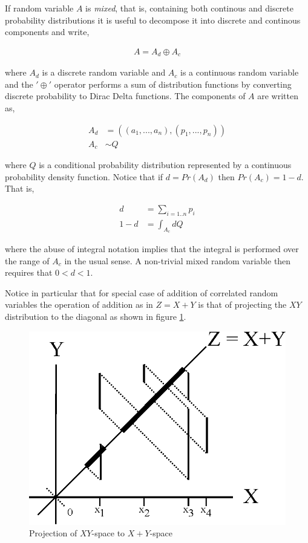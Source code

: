 If random variable $A$ is \emph{mixed}, that is, containing both continous and discrete probability distributions it is useful to decompose it into discrete and continous components and write,

\begin{align*}
A = A_d \oplus A_c
\end{align*}

where $A_d$ is a discrete random variable and $A_c$ is a continuous random variable and the $'\oplus'$ operator performs a sum of distribution functions by converting discrete probability to Dirac Delta functions. The components of $A$ are written as,

\begin{align*}
A_d &= ((a_1, ..., a_n),(p_1, ..., p_n))\\
A_c &\sim Q
\end{align*}

where $Q$ is a conditional probability distribution represented by a continuous probability density function. Notice that if $d = Pr(A_d)$ then $Pr(A_c) = 1-d$. That is,

\begin{align*}
d &= \sum_{i = 1..n}p_i\\
1-d &= \int_{A_c} dQ
\end{align*}

where the abuse of integral notation implies that the integral is performed over the range of $A_c$ in the usual sense. A non-trivial mixed random variable then requires that $0 < d < 1$. 

Notice in particular that for special case of addition of correlated random variables the operation of addition as in $Z = X+Y$ is that of projecting the $XY$ distribution to the diagonal as shown in figure \ref{fig:XY_addition_projection}. 

\begin{figure}
  \centering
  \includegraphics{Images/XY_addition_projection.eps}
  \caption[Projection of $XY$-space to $X+Y$-space]
          {Projection of $XY$-space to $X+Y$-space}
  \label{fig:XY_addition_projection}
\end{figure}

